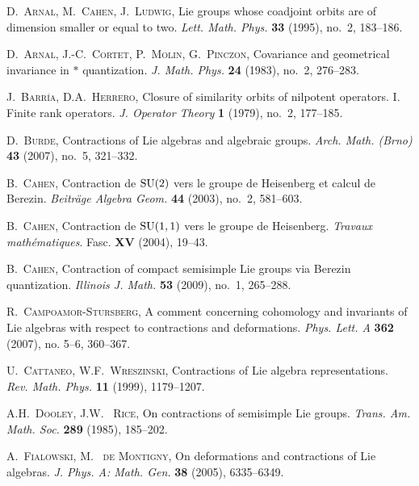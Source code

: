 \documentclass[
reqno]{amsart}
\begin{document}
\bigskip
\begin{thebibliography}{100000000}

\textsc{D.~Arnal, M.~Cahen, J.~Ludwig}, 
Lie groups whose coadjoint orbits are of dimension smaller or equal to two. 
\textit{Lett. Math. Phys.} \textbf{33} (1995), no.~2, 183--186.

\textsc{D.~Arnal, J.-C.~Cortet, P.~Molin, G.~Pinczon}, 
Covariance and geometrical invariance in $\ast$ quantization. 
\textit{J. Math. Phys.} \textbf{24} (1983), no.~2, 276--283.

\textsc{J.~Barr\'\i a, D.A.~Herrero}, 
Closure of similarity orbits of nilpotent operators. I. Finite rank operators. 
\textit{J. Operator Theory} \textbf{1} (1979), no.~2, 177--185. 

\textsc{D.~Burde}, 
Contractions of Lie algebras and algebraic groups. 
\textit{Arch. Math. (Brno)} \textbf{43} (2007), no.~5, 321--332.

\textsc{B.~Cahen}, 
Contraction de ${\rm SU}(2)$ vers le groupe de Heisenberg et calcul de Berezin. 
\textit{Beitr\"age Algebra Geom.} \textbf{44} (2003), no.~2, 581--603. 

\textsc{B.~Cahen}, 
Contraction de ${\rm SU}(1,1)$ vers le groupe de Heisenberg.  
\textit{Tra\-vaux ma\-th\'e\-ma\-tiques}. Fasc. \textbf{XV} (2004),  19--43.

\textsc{B.~Cahen}, 
Contraction of compact semisimple
Lie groups via Berezin quantization. 
\textit{Illinois J. Math.} \textbf{53} (2009), no.~1, 265--288. 

\textsc{R.~Campoamor-Stursberg}, 
A comment concerning cohomology and invariants of Lie algebras with respect to contractions and deformations. 
\textit{Phys. Lett. A} \textbf{362} (2007), no. 5--6, 360--367.

 \textsc{U.~Cattaneo, W.F.~Wreszinski},  
Contractions of Lie algebra representations. \textit{Rev. Math. Phys.} \textbf{11}
(1999), 1179--1207.

 \textsc{A.H.~Dooley, J.W. ~Rice},  On contractions of
semisimple Lie groups. \textit{Trans. Am. Math. Soc.} \textbf{289}
(1985), 185--202.

 \textsc{A.~Fialowski, M. ~de Montigny}, On deformations and contractions of Lie algebras. \textit{ J. Phys. A: Math. Gen.} \textbf{38}
(2005), 6335--6349.


\end{thebibliography}
\end{document}
